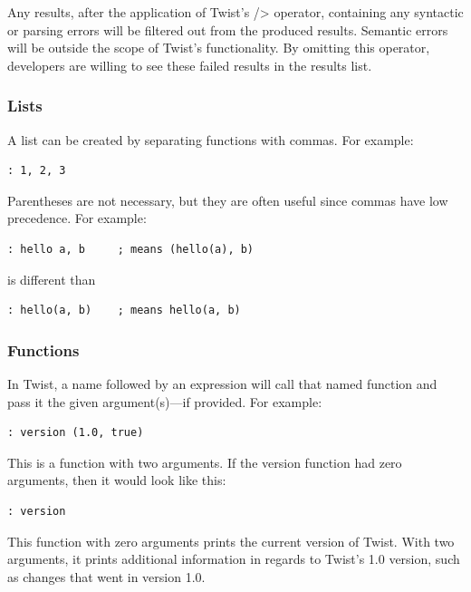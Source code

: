 Any results, after the application of Twist's /> operator, containing any syntactic or parsing errors will be filtered out from the produced results. Semantic errors will be outside the scope of Twist's functionality. By omitting this operator, developers are willing to see these failed results in the results list.

\subsubsection{Lists}
\label{sec:lists}

A list can be created by separating functions with commas. For example:

\begin{verbatim}
: 1, 2, 3
\end{verbatim}

Parentheses are not necessary, but they are often useful since commas have low precedence. For example:

\begin{verbatim}
: hello a, b     ; means (hello(a), b)
\end{verbatim}

is different than

\begin{verbatim}
: hello(a, b)    ; means hello(a, b)
\end{verbatim}

\subsubsection{Functions}
\label{sec:functions}

In Twist, a name followed by an expression will call that named function and pass it the given argument(s)---if provided. For example:

\begin{verbatim}
: version (1.0, true)
\end{verbatim}

This is a function with two arguments. If the version function had zero arguments, then it would look like this:

\begin{verbatim}
: version
\end{verbatim}

This function with zero arguments prints the current version of Twist. With two arguments, it prints additional information in regards to Twist's 1.0 version, such as changes that went in version 1.0. 

